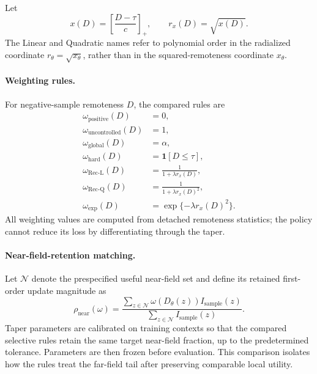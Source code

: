 \documentclass[sigconf,anonymous,review]{acmart}
\theoremstyle{acmdefinition}
\begin{document}
Let
\[
x(D)
=
\left[
\frac{D-\tau}{c}
\right]_{+},
\qquad
r_x(D)=\sqrt{x(D)}.
\]
The Linear and Quadratic names refer to polynomial order in the
radialized coordinate \(r_\theta=\sqrt{x_\theta}\), rather than in the
squared-remoteness coordinate \(x_\theta\).
\paragraph{Weighting rules.}
For negative-sample remoteness $D$, the compared rules are
\begin{equation}
\begin{aligned}
    \omega_{\mathrm{positive}}(D)
    &=0,\\
    \omega_{\mathrm{uncontrolled}}(D)
    &=1,\\
    \omega_{\mathrm{global}}(D)
    &=\alpha,\\
    \omega_{\mathrm{hard}}(D)
    &=
    \mathbf 1[D\leq\tau],\\
    \omega_{\mathrm{Rec\text{-}L}}(D)
    &=
    \frac{1}{1+\lambda r_x(D)},\\
    \omega_{\mathrm{Rec\text{-}Q}}(D)
    &=
    \frac{1}{1+\lambda r_x(D)^2},\\
    \omega_{\mathrm{exp}}(D)
    &=
    \exp\{-\lambda r_x(D)^2\}.
\end{aligned}
\label{eq:controlled_taper_rules}
\end{equation}
All weighting values are computed from detached remoteness statistics;
the policy cannot reduce its loss by differentiating through the taper.

\paragraph{Near-field-retention matching.}
Let $\mathcal N$ denote the prespecified useful near-field set and define
its retained first-order update magnitude as
\begin{equation}
    \rho_{\mathrm{near}}(\omega)
    =
    \frac{
        \sum_{z\in\mathcal N}
        \omega(D_\theta(z))
        I_{\mathrm{sample}}(z)
    }{
        \sum_{z\in\mathcal N}
        I_{\mathrm{sample}}(z)
    }.
    \label{eq:near_retention}
\end{equation}
Taper parameters are calibrated on training contexts so that the
compared selective rules retain the same target near-field fraction,
up to the predetermined tolerance. Parameters are then frozen before
evaluation. This comparison isolates how the rules treat the far-field
tail after preserving comparable local utility.
\end{document}
